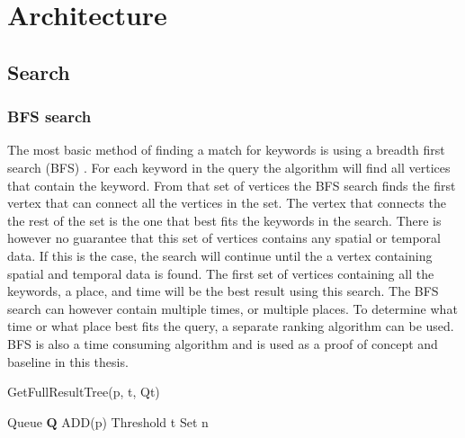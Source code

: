 \chapter{Architecture}
\label{cha:architecture}

\section{Search}
\subsection{BFS search}
The most basic method of finding a match for keywords is using a breadth first search (BFS) \citep{blinks, Shi:2016:TRS:2882903.2882941}. For each keyword in the query the algorithm will find all vertices that contain the keyword. From that set of vertices the BFS search finds the first vertex that can connect all the vertices in the set. The vertex that connects the the rest of the set is the one that best fits the keywords in the search. There is however no guarantee that this set of vertices contains any spatial or temporal data. If this is the case, the search will continue until the a vertex containing spatial and temporal data is found. The first set of vertices containing all the keywords, a place, and time will be the best result using this search. The BFS search can however contain multiple times, or multiple places. To determine what time or what place best fits the query, a separate ranking algorithm can be used. BFS is also a time consuming algorithm and is used as a proof of concept and baseline in this thesis.

\begin{algorithm}[H]
    \caption{GetFullResultTree(p, t, Qt)}
    \SetAlgoLined
    Queue $\mathbf{Q}$ ADD(p)\; Threshold t\; Set n \;
\end{algorithm}

